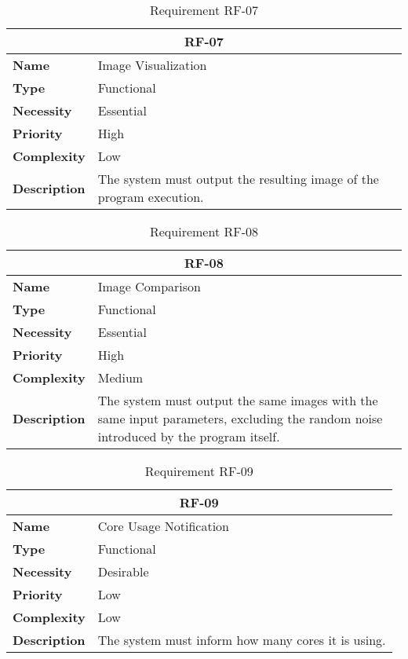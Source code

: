 \begin{table}[H]
    \centering
    \begin{tabular}{l p{10cm}}
        \toprule
        \multicolumn{2}{c}{\textbf{RF-07}} \\
        \toprule
        \textbf{Name}               & Image Visualization \\
        \textbf{Type}               & Functional \\
        \textbf{Necessity}          & Essential \\
        \textbf{Priority}           & High \\
        \textbf{Complexity}         & Low \\
        \textbf{Description}        & The system must output the resulting image of the program execution. \\
        \bottomrule
    \end{tabular}
\caption{Requirement RF-07}\label{tab:rf-07}
\end{table}

\begin{table}[H]
    \centering
    \begin{tabular}{l p{10cm}}
        \toprule
        \multicolumn{2}{c}{\textbf{RF-08}} \\
        \toprule
        \textbf{Name}               & Image Comparison \\
        \textbf{Type}               & Functional \\
        \textbf{Necessity}          & Essential \\
        \textbf{Priority}           & High \\
        \textbf{Complexity}         & Medium \\
        \textbf{Description}        & The system must output the same images with the same input parameters, excluding the random noise introduced by the program itself. \\
        \bottomrule
    \end{tabular}
\caption{Requirement RF-08}\label{tab:rf-08}
\end{table}

\begin{table}[H]
    \centering
    \begin{tabular}{l p{10cm}}
        \toprule
        \multicolumn{2}{c}{\textbf{RF-09}} \\
        \toprule
        \textbf{Name}               & Core Usage Notification \\
        \textbf{Type}               & Functional \\
        \textbf{Necessity}          & Desirable \\
        \textbf{Priority}           & Low \\
        \textbf{Complexity}         & Low \\
        \textbf{Description}        & The system must inform how many cores it is using. \\
        \bottomrule
    \end{tabular}
\caption{Requirement RF-09}\label{tab:rf-09}
\end{table}

